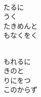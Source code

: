 \documentclass[10pt,b5j]{tarticle} %
\begin{document}
\begin{enumerate}
\begin{minipage}[c]{\blocksize}
    \end{minipage}
    \begin{minipage}[c]{\blocksize}
        
        \vspace{\linespace}
        \item~\\
        たるに\\
        うく\\
        たきめんと\\
        もなくをく
        
    \end{minipage}
    \begin{minipage}[c]{\blocksize}
        
        \vspace{\linespace}
        \item~\\
        もれるに\\
        きのと\\
        りにをつ\\
        このからず
    
    \end{minipage}
\end{enumerate} %
\end{document}
